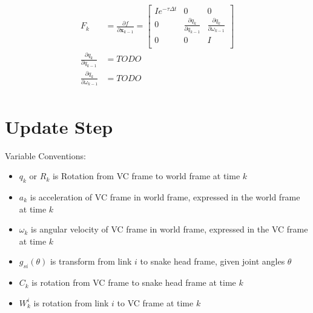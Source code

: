 \documentclass[11pt]{article}
\newcommand{\pd}[2]{\frac{\partial #1}{\partial #2}} %
\begin{document}
\begin{align*}
    F_k &= \pd{f}{\mathbf{x}_{k-1}} = \begin{bmatrix}
        Ie^{-\tau \Delta t} & 0 & 0 \\
        0 & \pd{q_k}{q_{k-1}} & \pd{q_k}{\omega_{k-1}} \\
        0 & 0 & I \\
    \end{bmatrix} \\
    \pd{q_k}{q_{k-1}} &= TODO \\
    \pd{q_k}{\omega_{k-1}} &= TODO \\
\end{align*}

\section{Update Step}
Variable Conventions:
\begin{itemize}
    \item $q_k$ or $R_k$ is Rotation from VC frame to world frame at time $k$
    \item $a_k$ is acceleration of VC frame in world frame, expressed in the world frame at time $k$
    \item $\omega_k$ is angular velocity of VC frame in world frame, expressed in the VC frame at time $k$
    \item $g_{si}(\theta)$ is transform from link $i$ to snake head frame, given joint angles $\theta$
    \item $C_k$ is rotation from VC frame to snake head frame at time $k$
    \item $W_k^i$ is rotation from link $i$ to VC frame at time $k$
\end{itemize} 
\end{document}
